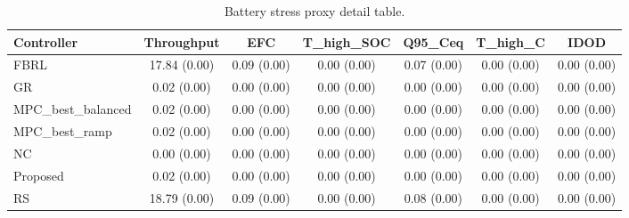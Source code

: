 \begin{table}[t]
\centering
\caption{Battery stress proxy detail table.}
\label{tab:stress_proxy_auto}
\begin{tabular}{lcccccc}
\toprule
Controller & Throughput & EFC & T\_high\_SOC & Q95\_Ceq & T\_high\_C & IDOD \\
\midrule
FBRL & 17.84 (0.00) & 0.09 (0.00) & 0.00 (0.00) & 0.07 (0.00) & 0.00 (0.00) & 0.00 (0.00) \\
GR & 0.02 (0.00) & 0.00 (0.00) & 0.00 (0.00) & 0.00 (0.00) & 0.00 (0.00) & 0.00 (0.00) \\
MPC\_best\_balanced & 0.02 (0.00) & 0.00 (0.00) & 0.00 (0.00) & 0.00 (0.00) & 0.00 (0.00) & 0.00 (0.00) \\
MPC\_best\_ramp & 0.02 (0.00) & 0.00 (0.00) & 0.00 (0.00) & 0.00 (0.00) & 0.00 (0.00) & 0.00 (0.00) \\
NC & 0.00 (0.00) & 0.00 (0.00) & 0.00 (0.00) & 0.00 (0.00) & 0.00 (0.00) & 0.00 (0.00) \\
Proposed & 0.02 (0.00) & 0.00 (0.00) & 0.00 (0.00) & 0.00 (0.00) & 0.00 (0.00) & 0.00 (0.00) \\
RS & 18.79 (0.00) & 0.09 (0.00) & 0.00 (0.00) & 0.08 (0.00) & 0.00 (0.00) & 0.00 (0.00) \\
\bottomrule
\end{tabular}
\end{table}
